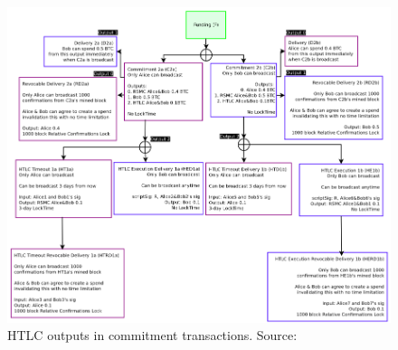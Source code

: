 \begin{figure}[ht]
    \centering
    \includegraphics[width=14cm]{figures/ln_htlc.png}
    \caption{HTLC outputs in commitment transactions.  Source:~\cite{poon2015bitcoin}}
    \label{fig:htlc_commit}
\end{figure}



